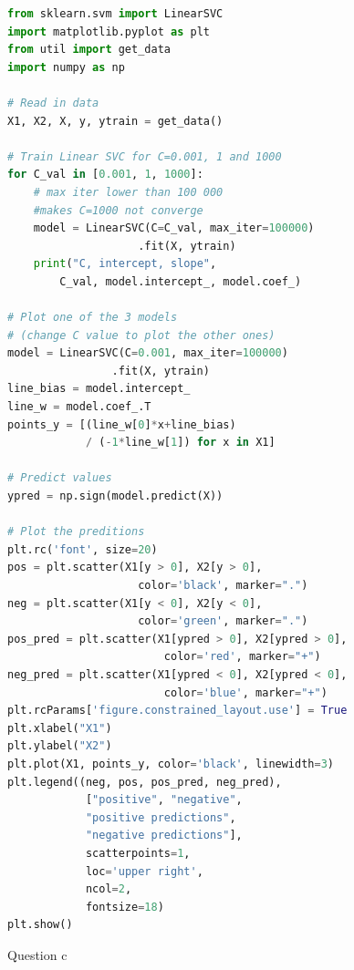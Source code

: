 \documentclass[10pt]{article}
\begin{document}
\begin{lstlisting}[language=Python]
from sklearn.svm import LinearSVC
import matplotlib.pyplot as plt
from util import get_data
import numpy as np

# Read in data
X1, X2, X, y, ytrain = get_data()

# Train Linear SVC for C=0.001, 1 and 1000
for C_val in [0.001, 1, 1000]:
    # max iter lower than 100 000 
    #makes C=1000 not converge
    model = LinearSVC(C=C_val, max_iter=100000)
                    .fit(X, ytrain)
    print("C, intercept, slope",
        C_val, model.intercept_, model.coef_)

# Plot one of the 3 models 
# (change C value to plot the other ones)
model = LinearSVC(C=0.001, max_iter=100000)
                .fit(X, ytrain)
line_bias = model.intercept_
line_w = model.coef_.T
points_y = [(line_w[0]*x+line_bias)
            / (-1*line_w[1]) for x in X1]

# Predict values
ypred = np.sign(model.predict(X))

# Plot the preditions
plt.rc('font', size=20)
pos = plt.scatter(X1[y > 0], X2[y > 0],
                    color='black', marker=".")
neg = plt.scatter(X1[y < 0], X2[y < 0],
                    color='green', marker=".")
pos_pred = plt.scatter(X1[ypred > 0], X2[ypred > 0],
                        color='red', marker="+")
neg_pred = plt.scatter(X1[ypred < 0], X2[ypred < 0],
                        color='blue', marker="+")
plt.rcParams['figure.constrained_layout.use'] = True
plt.xlabel("X1")
plt.ylabel("X2")
plt.plot(X1, points_y, color='black', linewidth=3)
plt.legend((neg, pos, pos_pred, neg_pred),
            ["positive", "negative",
            "positive predictions",
            "negative predictions"],
            scatterpoints=1,
            loc='upper right',
            ncol=2,
            fontsize=18)
plt.show()
\end{lstlisting}
Question c
\end{document}

